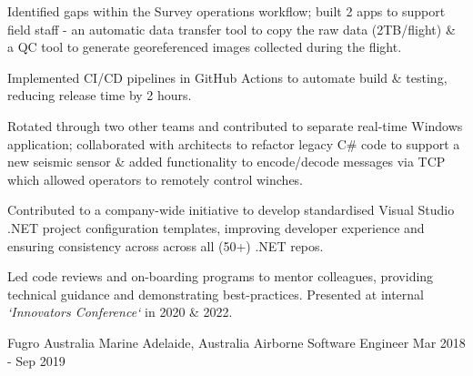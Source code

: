 {    \item Identified gaps within the Survey operations workflow; built 2 apps to support field staff - an automatic data transfer tool to copy the raw data (2TB/flight) \& a QC tool to generate georeferenced images collected during the flight.
    \item Implemented CI/CD pipelines in GitHub Actions to automate build \& testing, reducing release time by 2 hours.
    \item Rotated through two other teams and contributed to separate real-time Windows application; collaborated with architects to refactor legacy C\# code to support a new seismic sensor \& added functionality to encode/decode messages via TCP which allowed operators to remotely control winches. 
    \item \begin{justify}Contributed to a company-wide initiative to develop standardised Visual Studio .NET project configuration templates, improving developer experience and ensuring consistency across across all (50+) .NET repos.\end{justify}
    \item Led code reviews and on-boarding programs to mentor colleagues, providing technical guidance and demonstrating best-practices. Presented at internal \textit{`Innovators Conference`} in 2020 \& 2022. 
}

\workExperienceItem
    {Fugro Australia Marine}
    {Adelaide, Australia}
    {Airborne Software Engineer}
    {Mar 2018 - Sep 2019}


